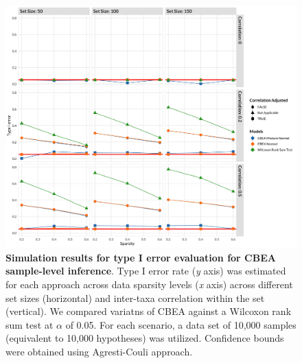 \documentclass{article}
\begin{document}
\begin{figure}[!h]
    \centering
    \includegraphics[width=\textwidth]{figures/sim_ss_fdr.png}
    \caption{\textbf{Simulation results for type I error evaluation for CBEA sample-level inference}. Type I error rate (\emph{y} axis) was estimated for each approach across data sparsity levels (\emph{x} axis) across different set sizes (horizontal) and inter-taxa correlation within the set (vertical). We compared variatns of CBEA against a Wilcoxon rank sum test at $\alpha$ of 0.05. For each scenario, a data set of 10,000 samples (equivalent to 10,000 hypotheses) was utilized. Confidence bounds were obtained using Agresti-Couli \cite{agresti1998} approach.}
    \label{fig:s1}
\end{figure}
\end{document}

